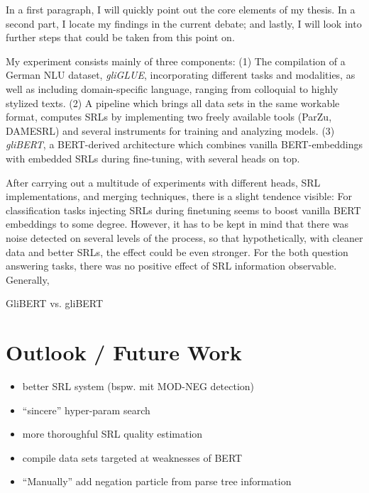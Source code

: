 \label{chap:6_conclusion}


In a first paragraph, I will quickly point out the core elements of my thesis. In a second part, I
locate my findings in the current debate; and lastly, I will look into further steps that could be
taken from this point on.

My experiment consists mainly of three components: (1) The compilation of a German NLU
dataset, \emph{gliGLUE}, incorporating different tasks and modalities, as well as
including domain-specific language, ranging from colloquial to highly stylized texts.
(2) A pipeline which brings all data sets in the same workable format, computes SRLs
by implementing two freely available tools (ParZu, DAMESRL) and several instruments
for training and analyzing models. (3) \emph{gliBERT}, a BERT-derived architecture
which combines vanilla BERT-embeddings with embedded SRLs during fine-tuning, with
several heads on top.

After carrying out a multitude of experiments with different heads, SRL implementations,
and merging techniques, there is a slight tendence visible: For classification tasks
injecting SRLs during finetuning seems to boost vanilla BERT embeddings to some degree.
However, it has to be kept in mind that there was noise detected on several levels of
the process, so that hypothetically, with cleaner data and better SRLs, the effect
could be {\color{red} even stronger}. For the both question answering tasks, there
was no positive effect of SRL information observable. Generally,


GliBERT vs. gliBERT


\section{Outlook / Future Work}



\begin{itemize}
  \item better SRL system (bspw. mit MOD-NEG detection)
  \item ``sincere'' hyper-param search
  \item more thoroughful SRL quality estimation
  \item compile data sets targeted at weaknesses of BERT
  \item ``Manually'' add negation particle from parse tree information
\end{itemize}


